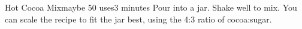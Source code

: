 \documentclass[../Cookbook.tex]{subfiles}
\begin{document}
\begin{recipe}[HotCocoaMix]{Hot Cocoa Mix}{maybe 50 uses}{3 minutes}
    Pour into a jar. Shake well to mix.
    You can scale the recipe to fit the jar best, using the 4:3 ratio of cocoa:sugar.
\end{recipe}
\end{document}
